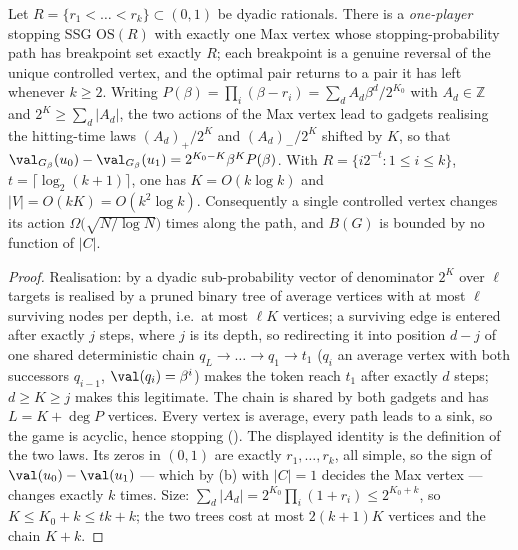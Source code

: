 \begin{theorem}\label{pp:one}
Let $R=\{r_1<\dots<r_k\}\subset(0,1)$ be dyadic rationals. There is a
\emph{one-player} stopping SSG $\mathrm{OS}(R)$ with exactly one Max vertex whose
stopping-probability path has breakpoint set exactly $R$; each breakpoint is a
genuine reversal of the unique controlled vertex, and the optimal pair returns
to a pair it has left whenever $k\ge2$. Writing
$P(\beta)=\prod_i(\beta-r_i)=\sum_dA_d\beta^{d}/2^{K_0}$ with $A_d\in\mathbb Z$
and $2^{K}\ge\sum_d|A_d|$, the two actions of the Max vertex lead to gadgets
realising the hitting-time laws $(A_d)_{+}/2^{K}$ and $(A_d)_{-}/2^{K}$ shifted
by $K$, so that
$\val_{G_\beta}(u_0)-\val_{G_\beta}(u_1)=2^{K_0-K}\beta^{K}P(\beta)$.
With $R=\{i2^{-t}:1\le i\le k\}$, $t=\lceil\log_2(k+1)\rceil$, one has
$K=O(k\log k)$ and $|V|=O(kK)=O(k^{2}\log k)$. Consequently a single controlled
vertex changes its action $\Omega\bigl(\sqrt{N/\log N}\bigr)$ times along the
path, and $B(G)$ is bounded by no function of $|C|$.
\end{theorem}

\begin{proof}
Realisation: by  a dyadic sub-probability vector of
denominator $2^{K}$ over $\ell$ targets is realised by a pruned binary tree of
average vertices with at most $\ell$ surviving nodes per depth, i.e.\ at most
$\ell K$ vertices; a surviving edge is entered after exactly $j$ steps, where
$j$ is its depth, so redirecting it into position $d-j$ of one shared
deterministic chain $q_{L}\to\dots\to q_1\to t_1$ ($q_i$ an average vertex with
both successors $q_{i-1}$, $\val(q_i)=\beta^{i}$) makes the token reach $t_1$
after exactly $d$ steps; $d\ge K\ge j$ makes this legitimate. The chain is
shared by both gadgets and has $L=K+\deg P$ vertices. Every vertex is average,
every path leads to a sink, so the game is acyclic, hence stopping
(). The displayed identity is the definition of the two
laws. Its zeros in $(0,1)$ are exactly $r_1,\dots,r_k$, all simple, so the sign
of $\val(u_0)-\val(u_1)$ --- which by (b) with $|C|=1$ decides the
Max vertex --- changes exactly $k$ times. Size: $\sum_d|A_d|=2^{K_0}\prod_i(1+r_i)
\le2^{K_0+k}$, so $K\le K_0+k\le tk+k$; the two trees cost at most $2(k+1)K$
vertices and the chain $K+k$.
\end{proof}

